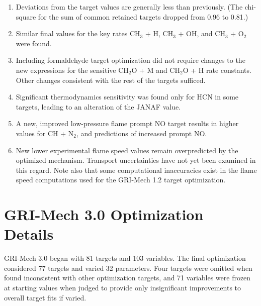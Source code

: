 \begin{enumerate}
    \item Deviations from the target values are generally less than previously. (The chi-square for the sum of common retained targets dropped from 0.96 to 0.81.)
    \item Similar final values for the key rates CH$_3$ + H, CH$_3$ + OH, and CH$_3$ + O$_2$ were found.
    \item Including formaldehyde target optimization did not require changes to the new expressions for the sensitive CH$_2$O + M and CH$_2$O + H rate constants. Other changes consistent with the rest of the targets sufficed.
    \item Significant thermodynamics sensitivity was found only for HCN in some targets, leading to an alteration of the JANAF value.
    \item A new, improved low-pressure flame prompt NO target results in higher values for CH + N$_2$, and predictions of increased prompt NO.
    \item New lower experimental flame speed values remain overpredicted by the optimized mechanism. Transport uncertainties have not yet been examined in this regard. Note also that some computational inaccuracies exist in the flame speed computations used for the GRI-Mech 1.2 target optimization.
\end{enumerate}

\section*{GRI-Mech 3.0 Optimization Details}
GRI-Mech 3.0 began with 81 targets and 103 variables. The final optimization considered 77 targets and varied 32 parameters. Four targets were omitted when found inconsistent with other optimization targets, and 71 variables were frozen at starting values when judged to provide only insignificant improvements to overall target fits if varied.

